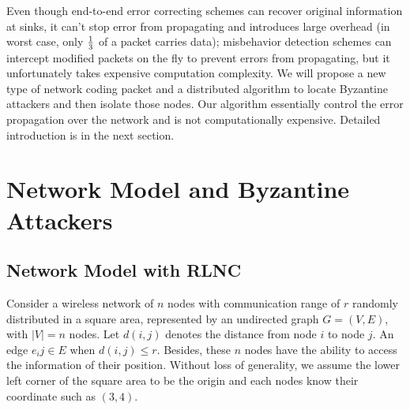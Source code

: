 \documentclass[conference]{IEEEtran}
\begin{document}
Even though end-to-end error correcting schemes can recover original information at sinks, it can't stop error from propagating and introduces large overhead (in worst case, only ${1\over 3}$ of a packet carries data); misbehavior detection schemes can intercept modified packets on the fly to prevent errors from propagating, but it unfortunately takes expensive computation complexity. We will propose a new type of network coding packet and a distributed algorithm to locate Byzantine attackers and then isolate those nodes. Our algorithm essentially control the error propagation over the network and is not computationally expensive. Detailed introduction is in the next section.

\section{Network Model and Byzantine Attackers}
\subsection{Network Model with RLNC}
Consider a wireless network of $n$ nodes with communication range of $r$ randomly distributed in a square area, represented by an undirected graph $G=(V,E)$, with $\mid V\mid =n$ nodes. Let $d(i,j)$ denotes the distance from node $i$ to node $j$. An edge $e_ij \in E$ when $d(i,j)\leq r$. Besides, these $n$ nodes have the ability to access the information of their position. Without loss of generality, we assume the lower left corner of the square area to be the origin and each nodes know their coordinate such as $(3, 4)$.
\end{document}

